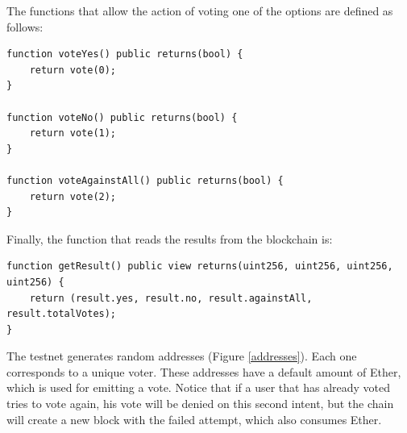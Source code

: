 \documentclass[10pt]{article}
\begin{document}
\begin{multicols}{2}
The functions that allow the action of voting one of the options are defined as follows:

\begin{lstlisting}[language=Solidity, numbers=none]
function voteYes() public returns(bool) {
	return vote(0);
}

function voteNo() public returns(bool) {
	return vote(1);
}

function voteAgainstAll() public returns(bool) {
	return vote(2);
}
\end{lstlisting}

Finally, the function that reads the results from the blockchain is:

\begin{lstlisting}[language=Solidity, numbers=none]
function getResult() public view returns(uint256, uint256, uint256, uint256) {
	return (result.yes, result.no, result.againstAll, result.totalVotes);
}
\end{lstlisting}

The testnet generates random addresses (Figure \ref{addresses}). Each one corresponds to a unique voter. These addresses have a default amount of Ether, which is used for emitting a vote. Notice that if a user that has already voted tries to vote again, his vote will be denied on this second intent, but the chain will create a new block with the failed attempt, which also consumes Ether.\\

\\\\


\end{multicols}
\end{document}

